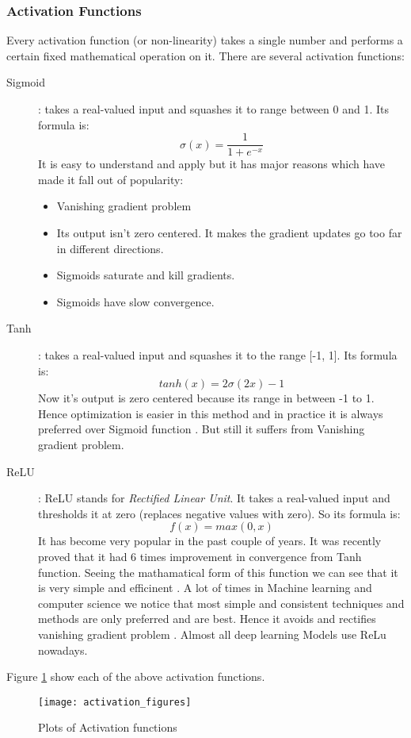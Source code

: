 \subsubsection{Activation Functions} 
Every activation function (or non-linearity) takes a single number and performs a certain fixed mathematical operation on it. There are
several activation functions:
\begin{description}
\item[ Sigmoid ] : takes a real-valued input and squashes it to range between 0 and 1. Its formula is:
  \[ \sigma(x) = \frac{1}{1 + e^{-x} } \]
  It is easy to understand and apply but it has major reasons which have made it fall out of popularity:
  \begin{itemize}
  \item Vanishing gradient problem
  \item Its output isn’t zero centered. It makes the gradient updates go too far in different directions.
  \item Sigmoids saturate and kill gradients.
  \item Sigmoids have slow convergence.
  \end{itemize}

\item [ Tanh ] : takes a real-valued input and squashes it to the range [-1, 1]. Its formula is:
  \[ tanh(x) = 2 \sigma(2x) -1 \]
  Now it’s output is zero centered because its range in between -1 to 1. Hence optimization is easier in this method and  in practice it is always preferred over Sigmoid function . But still it suffers from Vanishing gradient problem.

\item[ ReLU ]: ReLU stands for \textit{Rectified Linear Unit}. It takes a real-valued input and thresholds it at zero (replaces negative values with zero). So its formula is:
  \[ f(x) = max(0,x) \]
  It has become very popular in the past couple of years. It was recently proved that it had 6 times improvement in convergence from Tanh
  function. Seeing the mathamatical form of this function we can see that it is very simple and efficinent . A lot of times in Machine
  learning and computer science we notice that most simple and consistent techniques and methods are only preferred and are best.
  Hence it avoids and rectifies vanishing gradient problem . Almost all deep learning Models use ReLu nowadays.
\end{description}

Figure \ref{fig:Activation}  show each of the above activation functions.
\begin{figure}[h]
  \centering
  \texttt{[image: activation\_figures]}
  \caption{Plots of Activation functions}
  \label{fig:Activation}
\end{figure}

